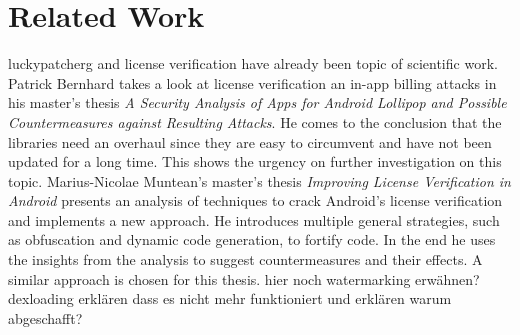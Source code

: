 \section{Related Work} \label{subsection:introduction-related}
\gls{luckypatcherg} and license verification have already been topic of scientific work.
\newline
Patrick Bernhard takes a look at license verification an in-app billing attacks in his master's thesis \textit{A Security Analysis of Apps for Android Lollipop and Possible Countermeasures against Resulting Attacks}.
He comes to the conclusion that the libraries need an overhaul since they are easy to circumvent and have not been updated for a long time.
This shows the urgency on further investigation on this topic.
\newline
Marius-Nicolae Muntean's master's thesis \textit{Improving License Verification in Android} presents an analysis of techniques to crack Android's license verification and implements a new approach.
He introduces multiple general strategies, such as obfuscation and dynamic code generation, to fortify code.
In the end he uses the insights from the analysis to suggest countermeasures and their effects.
A similar approach is chosen for this thesis.
\newline
hier noch watermarking erwähnen?
dexloading erklären dass es nicht mehr funktioniert und erklären warum abgeschafft?
